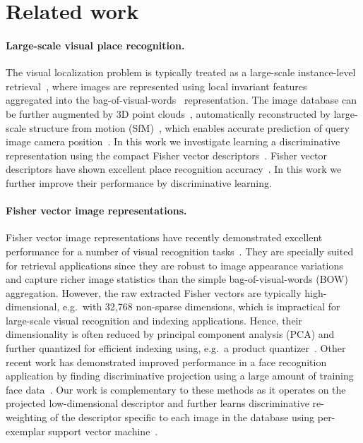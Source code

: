 \documentclass[10pt,twocolumn,letterpaper]{article}
\begin{document}
\section{Related work} 
\label{sec:related}

\paragraph{Large-scale visual place recognition.} %
    The visual localization problem is typically treated as a large-scale instance-level retrieval~\cite{Cummins09,Chen11,Gronat13,Knopp2010,Schindler07,Torii2013,Zamir10}, where images are represented using local invariant features~\cite{Lowe04} aggregated into the bag-of-visual-words~\cite{Csurka04,Sivic03} representation. The image database can be further augmented by 3D point clouds~\cite{Klinger13}, automatically reconstructed by large-scale structure from motion (SfM)~\cite{Agarwal-ICCV-2009,Klinger13}, which enables accurate prediction of query image camera position~\cite{Li12,Sattler12}. In this work we investigate learning a discriminative representation using the compact Fisher vector descriptors~\cite{Jegou12}. Fisher vector descriptors have shown excellent place recognition accuracy~\cite{Torii2013}. In this work we further improve their performance by discriminative learning.



\paragraph{Fisher vector image representations.} %
    Fisher vector image representations have recently demonstrated excellent performance for a number of visual recognition tasks~\cite{Chatfield11,Jegou12,Krapac2011,Simonyan2013}. They are specially suited for retrieval applications since they are robust to image appearance variations and capture richer image statistics than the simple bag-of-visual-words (BOW) aggregation. However, the raw extracted Fisher vectors are typically high-dimensional, e.g.\ with 32,768 non-sparse dimensions, which is impractical for large-scale visual recognition and indexing applications. Hence, their dimensionality is often reduced by principal component analysis (PCA) and further quantized for efficient indexing using, e.g.\ a product quantizer~\cite{Jegou12}.  Other recent work has demonstrated improved performance in a face recognition application by finding discriminative projection using a large amount of training face data~\cite{Simonyan2013}. Our work is complementary to these methods as it operates on the projected low-dimensional descriptor and further learns discriminative re-weighting of the descriptor specific to each image in the database using per-exemplar support vector machine~\cite{Malisiewicz11}.
\end{document}
